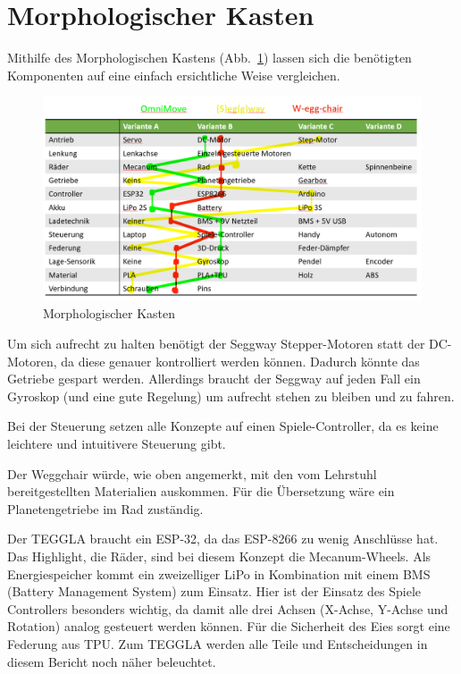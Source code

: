 \section{Morphologischer Kasten}
Mithilfe des Morphologischen Kastens (Abb.~\ref{bild:morphkasten}) lassen sich die benötigten Komponenten auf eine einfach ersichtliche Weise vergleichen.
\begin{figure}[!htb]
	\centering
	\includegraphics[width=\textwidth]{bilder/morphkasten.png}
	\caption{Morphologischer Kasten}
	\label{bild:morphkasten}
\end{figure}

Um sich aufrecht zu halten benötigt der Seggway Stepper-Motoren statt der DC-Motoren, da diese genauer kontrolliert werden können.
Dadurch könnte das Getriebe gespart werden. Allerdings braucht der Seggway auf jeden Fall ein Gyroskop (und eine gute Regelung) um aufrecht stehen zu bleiben und zu fahren. 

Bei der Steuerung setzen alle Konzepte auf einen Spiele-Controller, da es keine leichtere und intuitivere Steuerung gibt.

Der Weggchair würde, wie oben angemerkt, mit den vom Lehrstuhl bereitgestellten Materialien auskommen. Für die Übersetzung wäre ein Planetengetriebe im Rad zuständig. 

Der TEGGLA braucht ein ESP-32, da das ESP-8266 zu wenig Anschlüsse hat. Das Highlight, die Räder, sind bei diesem Konzept die Mecanum-Wheels. Als Energiespeicher kommt ein zweizelliger LiPo in Kombination mit einem BMS (Battery Management System) zum Einsatz. Hier ist der Einsatz des Spiele Controllers besonders wichtig, da damit alle drei Achsen (X-Achse, Y-Achse und Rotation) analog gesteuert werden können. Für die Sicherheit des Eies sorgt eine Federung aus TPU. Zum TEGGLA werden alle Teile und Entscheidungen in diesem Bericht noch näher beleuchtet. 



